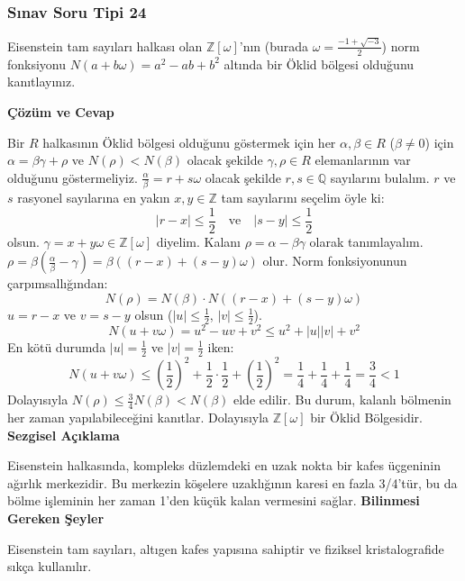 \documentclass[11pt, a4paper]{article}
\newenvironment{cozum}{
    \vspace{0.5cm}
    \noindent\textcolor{green!60!black}{\faCheckCircle\enspace \textbf{\Large Çözüm ve Cevap}}\par\vspace{0.2cm}
}{}
\newenvironment{sezgisel}{
    \vspace{0.5cm}
    \noindent\textcolor{orange!80!black}{\faLightbulb\enspace \textbf{\Large Sezgisel Açıklama}}\par\vspace{0.2cm}
    \itshape
}{}
\newenvironment{bilgi}{
    \vspace{0.5cm}
    \noindent\textcolor{red!70!black}{\faExclamationTriangle\enspace \textbf{\Large Bilinmesi Gereken Şeyler}}\par\vspace{0.2cm}
}{}
\begin{document}
\subsubsection{Sınav Soru Tipi 24}
\begin{sinavbox}
Eisenstein tam sayıları halkası olan $\mathbb{Z}[\omega]$'nın (burada $\omega = \frac{-1+\sqrt{-3}}{2}$) norm fonksiyonu $N(a+b\omega) = a^2-ab+b^2$ altında bir Öklid bölgesi olduğunu kanıtlayınız.
\end{sinavbox}
\begin{cozum}
Bir $R$ halkasının Öklid bölgesi olduğunu göstermek için her $\alpha, \beta \in R$ ($\beta \neq 0$) için $\alpha = \beta\gamma + \rho$ ve $N(\rho) < N(\beta)$ olacak şekilde $\gamma, \rho \in R$ elemanlarının var olduğunu göstermeliyiz.
$\frac{\alpha}{\beta} = r + s\omega$ olacak şekilde $r, s \in \mathbb{Q}$ sayılarını bulalım.
$r$ ve $s$ rasyonel sayılarına en yakın $x, y \in \mathbb{Z}$ tam sayılarını seçelim öyle ki:
\[ |r-x| \le \frac{1}{2} \quad \text{ve} \quad |s-y| \le \frac{1}{2} \]
olsun. $\gamma = x + y\omega \in \mathbb{Z}[\omega]$ diyelim. Kalanı $\rho = \alpha - \beta\gamma$ olarak tanımlayalım.
$\rho = \beta \left( \frac{\alpha}{\beta} - \gamma \right) = \beta \left( (r-x) + (s-y)\omega \right)$ olur.
Norm fonksiyonunun çarpımsallığından:
\[ N(\rho) = N(\beta) \cdot N((r-x) + (s-y)\omega) \]
$u = r-x$ ve $v = s-y$ olsun ($|u| \le \frac{1}{2}$, $|v| \le \frac{1}{2}$).
\[ N(u+v\omega) = u^2 - uv + v^2 \le u^2 + |u||v| + v^2 \]
En kötü durumda $|u| = \frac{1}{2}$ ve $|v| = \frac{1}{2}$ iken:
\[ N(u+v\omega) \le \left(\frac{1}{2}\right)^2 + \frac{1}{2}\cdot\frac{1}{2} + \left(\frac{1}{2}\right)^2 = \frac{1}{4} + \frac{1}{4} + \frac{1}{4} = \frac{3}{4} < 1 \]
Dolayısıyla $N(\rho) \le \frac{3}{4} N(\beta) < N(\beta)$ elde edilir.
Bu durum, kalanlı bölmenin her zaman yapılabileceğini kanıtlar. Dolayısıyla $\mathbb{Z}[\omega]$ bir Öklid Bölgesidir.
\end{cozum}
\begin{sezgisel}
Eisenstein halkasında, kompleks düzlemdeki en uzak nokta bir kafes üçgeninin ağırlık merkezidir. Bu merkezin köşelere uzaklığının karesi en fazla 3/4'tür, bu da bölme işleminin her zaman 1'den küçük kalan vermesini sağlar.
\end{sezgisel}
\begin{bilgi}
Eisenstein tam sayıları, altıgen kafes yapısına sahiptir ve fiziksel kristalografide sıkça kullanılır.
\end{bilgi}

\newpage
\end{document}
